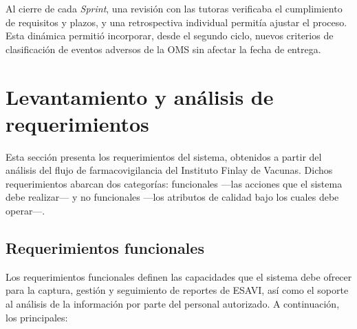 Al cierre de cada \textit{Sprint}, una revisión con las tutoras verificaba el cumplimiento de requisitos y plazos, y una retrospectiva individual permitía ajustar el proceso. 
Esta dinámica permitió incorporar, desde el segundo ciclo, nuevos criterios de clasificación de eventos adversos de la OMS sin afectar la fecha de entrega.

\section{Levantamiento y análisis de requerimientos}
\label{section:requerimientos}

Esta sección presenta los requerimientos del sistema, obtenidos a partir del análisis del flujo de farmacovigilancia del Instituto Finlay de Vacunas. 
Dichos requerimientos abarcan dos categorías: funcionales —las acciones que el sistema debe realizar— y no funcionales —los atributos de calidad bajo los cuales debe operar—.

\subsection{Requerimientos funcionales}
\label{subsection:requerimientos_funcionales}

Los requerimientos funcionales definen las capacidades que el sistema debe ofrecer para la captura, gestión y seguimiento de reportes de ESAVI, así como el soporte al análisis de la información por parte del personal autorizado. 
A continuación, los principales:

